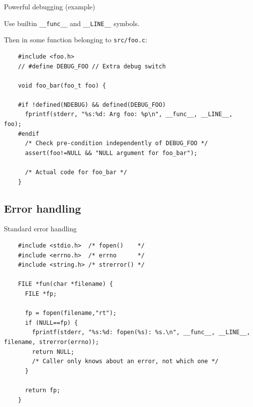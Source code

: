 \begin{frame}[fragile]{Powerful debugging (example)}

  Use builtin \lstinline{__func__} and \lstinline{__LINE__} symbols.
  
  Then in some function belonging to \lstinline{src/foo.c}:

  \begin{lstlisting}
    #include <foo.h>
    // #define DEBUG_FOO // Extra debug switch

    void foo_bar(foo_t foo) {

    #if !defined(NDEBUG) && defined(DEBUG_FOO)
      fprintf(stderr, "%s:%d: Arg foo: %p\n", __func__, __LINE__, foo);
    #endif
      /* Check pre-condition independently of DEBUG_FOO */
      assert(foo!=NULL && "NULL argument for foo_bar");

      /* Actual code for foo_bar */
    }
  \end{lstlisting}
  
\end{frame}


\subsection{Error handling}

\begin{frame}[fragile]{Standard error handling}

  \begin{lstlisting}
    #include <stdio.h>  /* fopen()    */
    #include <errno.h>  /* errno      */
    #include <string.h> /* strerror() */

    FILE *fun(char *filename) {
      FILE *fp;

      fp = fopen(filename,"rt");
      if (NULL==fp) {
        fprintf(stderr, "%s:%d: fopen(%s): %s.\n", __func__, __LINE__, filename, strerror(errno));
        return NULL;
        /* Caller only knows about an error, not which one */
      }

      return fp;
    }
  \end{lstlisting}
  
\end{frame}


